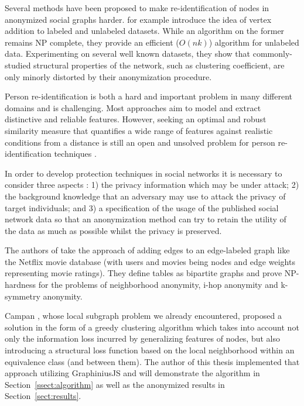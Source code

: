 \documentclass{llncs}
\begin{document}
Several methods have been proposed to make re-identification of nodes in anonymized social graphs harder.	\cite{chester2011k} for example introduce the idea of vertex addition to labeled and unlabeled datasets. While an algorithm on the former remains NP complete, they provide an efficient ($O(nk)$) algorithm for unlabeled data. Experimenting on several well known datasets, they show that commonly-studied structural properties of the network, such as clustering coefficient, are only minorly distorted by their anonymization procedure.

Person re-identification is both a hard and important problem in many different domains and is challenging. Most approaches aim to model and extract distinctive and reliable features. However, seeking an optimal and robust similarity measure that quantifies a wide range of features against realistic conditions from a distance is still an open and unsolved problem for person re-identification techniques \cite{Zheng:2013:reidentification}. 

In order to develop protection techniques in social networks it is necessary to consider three aspects \cite{Zhou:2008:SurveyAnonNetwork}: 1) the privacy information which may be
under attack; 2) the background knowledge that an adversary may use to attack the privacy
of target individuals; and 3) a specification of the usage of the published social network data so that an anonymization method can try to retain the utility of the data as much as possible whilst the privacy is preserved. 

The authors of \cite{kapron2011social} take the approach of adding edges to an edge-labeled graph like the Netflix movie database (with users and movies being nodes and edge weights representing movie ratings). They define tables as bipartite graphs and prove NP-hardness for the problems of neighborhood anonymity, i-hop anonymity and k-symmetry anonymity.

Campan \cite{campan2009data}, whose local subgraph problem we already encountered, proposed a solution in the form of a greedy clustering algorithm which takes into account not only the information loss incurred by generalizing features of nodes, but also introducing a structural loss function based on the local neighborhood within an equivalence class (and between them). The author of this thesis implemented that approach utilizing GraphiniusJS and will demonstrate the algorithm in Section~\ref{ssect:algorithm} as well as the anonymized results in Section~\ref{sect:results}.
\end{document}
